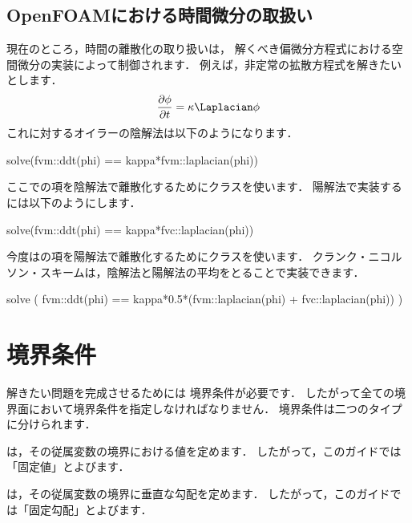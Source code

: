 \subsection{OpenFOAMにおける時間微分の取扱い}
\label{ssec:2.5.1}
%
現在のところ，時間の離散化の取り扱いは，
解くべき偏微分方程式における空間微分の実装によって制御されます．
例えば，非定常の拡散方程式を解きたいとします．
\begin{align}
 \label{eq:2.37}
 \frac{\partial\phi}{\partial t} = \kappa\Laplacian\phi
\end{align}
これに対するオイラーの陰解法は以下のようになります．
\begin{OFverbatim}[file]
solve(fvm::ddt(phi) == kappa*fvm::laplacian(phi))
\end{OFverbatim}
ここでの項を陰解法で離散化するためにクラスを使います．
陽解法で実装するには以下のようにします．
\begin{OFverbatim}[file]
solve(fvm::ddt(phi) == kappa*fvc::laplacian(phi))
\end{OFverbatim}
今度はの項を陽解法で離散化するためにクラスを使います．
クランク・ニコルソン・スキームは，陰解法と陽解法の平均をとることで実装できます．
\begin{OFverbatim}[file]
solve
    (
    fvm::ddt(phi)
    ==
    kappa*0.5*(fvm::laplacian(phi) + fvc::laplacian(phi))
    )
\end{OFverbatim}



\section{境界条件}
\label{sec:2.6}
解きたい問題を完成させるためには
%
境界条件が必要です．
したがって全ての境界面において境界条件を指定しなければなりません．
境界条件は二つのタイプに分けられます．
\begin{description}
%
 \item[ディリクレ条件] は，その従属変数の境界における値を定めます．
            したがって，このガイドでは「固定値」とよびます．
%
 \item[ノイマン条件] は，その従属変数の境界に垂直な勾配を定めます．
            したがって，このガイドでは「固定勾配」とよびます．
\end{description}


